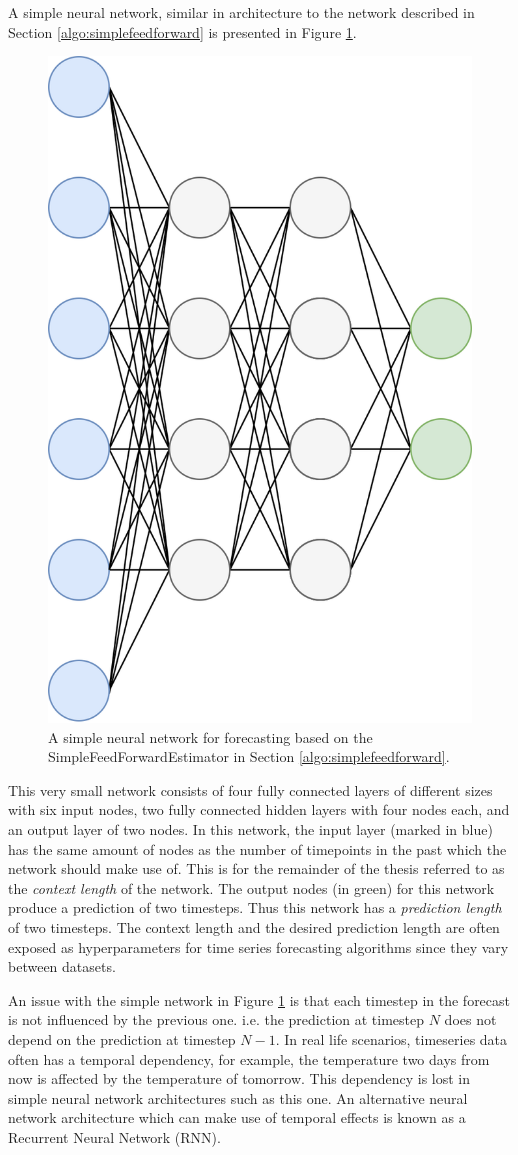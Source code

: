 A simple neural network, similar in architecture to the network described in Section \ref{algo:simplefeedforward} is presented in Figure \ref{fig:simplefeedforward}.

\begin{figure}[htb]
  \centering
  \includegraphics[width=0.5\linewidth]{./img/simplefeedforward.png}
  \caption{A simple neural network for forecasting based on the SimpleFeedForwardEstimator in Section \ref{algo:simplefeedforward}.}
  \label{fig:simplefeedforward}
\end{figure}
\clearpage

This very small network consists of four fully connected layers of different sizes with six input nodes, two fully connected hidden layers with four nodes each, and an output layer of two nodes. In this network, the input layer (marked in blue) has the same amount of nodes as the number of timepoints in the past which the network should make use of. This is for the remainder of the thesis referred to as the \textit{context length} of the network. The output nodes (in green) for this network produce a prediction of two timesteps. Thus this network has a \textit{prediction length} of two timesteps. The context length and the desired prediction length are often exposed as hyperparameters for time series forecasting algorithms since they vary between datasets.

An issue with the simple network in Figure \ref{fig:simplefeedforward} is that each timestep in the forecast is not influenced by the previous one. i.e. the prediction at timestep \(N\) does not depend on the prediction at timestep \(N-1\). In real life scenarios, timeseries data often has a temporal dependency, for example, the temperature two days from now is affected by the temperature of tomorrow. This dependency is lost in simple neural network architectures such as this one. An alternative neural network architecture which can make use of temporal effects is known as a Recurrent Neural Network (RNN).

